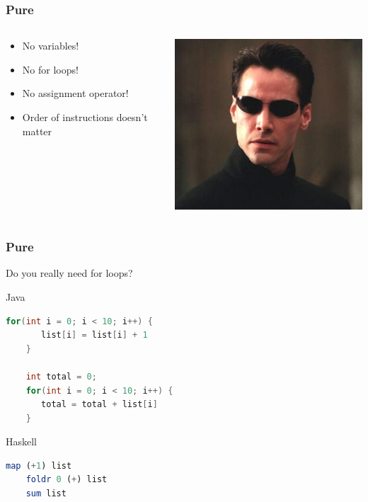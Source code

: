\documentclass{beamer}
\begin{document}
\begin{frame}
\frametitle{Pure}

 \begin{columns}[]
  \begin{column}[]{5cm}
   \begin{itemize}
    \item No variables!
    \item No for loops!
    \item No assignment operator!
    \item Order of instructions doesn't matter
   \end{itemize}
  \end{column}
  \begin{column}[]{5cm}
    \includegraphics[width=0.7\linewidth]{figs/neo}
  \end{column}
 \end{columns}
 \vspace{0.5cm}
 
\end{frame}

\begin{frame}[fragile]
\frametitle{Pure}
Do you really need for loops?

 \begin{block}{Java}
  \begin{lstlisting}[language=Java]
    for(int i = 0; i < 10; i++) {
       list[i] = list[i] + 1 
    }

    int total = 0;
    for(int i = 0; i < 10; i++) {
       total = total + list[i] 
    }

  \end{lstlisting}
 \end{block}
 
 \begin{block}{Haskell}
  \begin{lstlisting}[language=Haskell]
    map (+1) list
    foldr 0 (+) list
    sum list
  \end{lstlisting}
 \end{block}

\end{frame}
\end{document}
